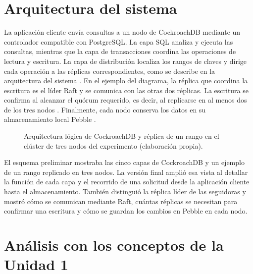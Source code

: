 \documentclass[11pt,a4paper]{article}
\newcommand{\sistemaA}{CockroachDB}      %
\begin{document}
\section{Arquitectura del sistema}
La aplicación cliente envía consultas a un nodo de CockroachDB mediante un controlador compatible con PostgreSQL. La capa SQL analiza y ejecuta las consultas, mientras que la capa de transacciones coordina las operaciones de lectura y escritura. La capa de distribución localiza los rangos de claves y dirige cada operación a las réplicas correspondientes, como se describe en la arquitectura del sistema \cite{cockroachlabsArchitecture}. En el ejemplo del diagrama, la réplica que coordina la escritura es el líder Raft y se comunica con las otras dos réplicas. La escritura se confirma al alcanzar el quórum requerido, es decir, al replicarse en al menos dos de los tres nodos \cite{cockroachlabsReplication}. Finalmente, cada nodo conserva los datos en su almacenamiento local Pebble \cite{cockroachlabsStorage}.

\begin{figure}[H]
  \centering
  \resizebox{\textwidth}{!}{}
  \caption{Arquitectura lógica de \sistemaA{} y réplica de un rango en el clúster de tres nodos del experimento (elaboración propia).}
  \label{fig:arquitectura}
\end{figure}

El esquema preliminar mostraba las cinco capas de CockroachDB y un ejemplo de un rango replicado en tres nodos. La versión final amplió esa vista al detallar la función de cada capa y el recorrido de una solicitud desde la aplicación cliente hasta el almacenamiento. También distinguió la réplica líder de las seguidoras y mostró cómo se comunican mediante Raft, cuántas réplicas se necesitan para confirmar una escritura y cómo se guardan los cambios en Pebble en cada nodo.

\section{Análisis con los conceptos de la Unidad 1}
\end{document}
